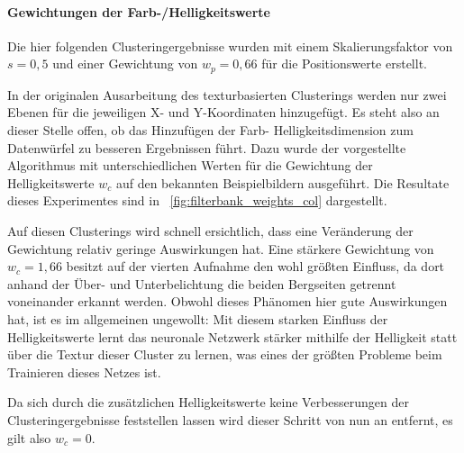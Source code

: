 \paragraph{Gewichtungen der Farb-/Helligkeitswerte}
Die hier folgenden Clusteringergebnisse wurden mit einem Skalierungsfaktor von $s=0,5$ und einer Gewichtung von $w_p=0,66$ für die Positionswerte erstellt.

In der originalen Ausarbeitung des texturbasierten Clusterings \cite{jain_91} werden nur zwei Ebenen für die jeweiligen X- und Y-Koordinaten hinzugefügt. Es steht also an dieser Stelle offen, ob das Hinzufügen der Farb- \bzw Helligkeitsdimension zum Datenwürfel zu besseren Ergebnissen führt. Dazu wurde der vorgestellte Algorithmus mit unterschiedlichen Werten für die Gewichtung der Helligkeitswerte $w_c$ auf den bekannten Beispielbildern ausgeführt. Die Resultate dieses Experimentes sind in \figurename~\ref{fig:filterbank_weights_col} dargestellt.

Auf diesen Clusterings wird schnell ersichtlich, dass eine Veränderung der Gewichtung relativ geringe Auswirkungen hat. Eine stärkere Gewichtung von $w_c=1,66$ besitzt auf der vierten Aufnahme den wohl größten Einfluss, da dort anhand der Über- und Unterbelichtung die beiden Bergseiten getrennt voneinander erkannt werden. Obwohl dieses Phänomen hier gute Auswirkungen hat, ist es im allgemeinen ungewollt: Mit diesem starken Einfluss der Helligkeitswerte lernt das neuronale Netzwerk stärker mithilfe der Helligkeit statt über die Textur dieser Cluster zu lernen, was eines der größten Probleme beim Trainieren dieses Netzes ist.

Da sich durch die zusätzlichen Helligkeitswerte keine Verbesserungen der Clusteringergebnisse feststellen lassen wird dieser Schritt von nun an entfernt, es gilt also $w_c=0$.


